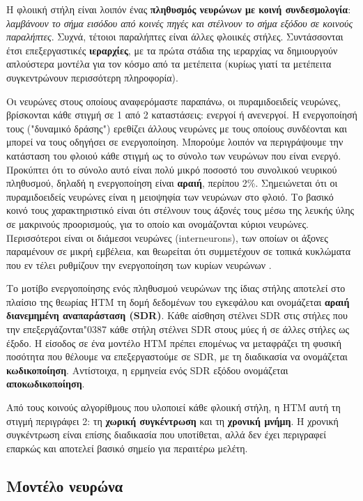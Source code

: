 	Η φλοιική στήλη είναι λοιπόν ένας \textbf{πληθυσμός νευρώνων με κοινή συνδεσμολογία}: \textit{λαμβάνουν το σήμα εισόδου από κοινές πηγές και στέλνουν το σήμα εξόδου σε κοινούς παραλήπτες}.
	Συχνά, τέτοιοι παραλήπτες είναι άλλες φλοιικές στήλες.
	Συντάσσονται έτσι επεξεργαστικές \textbf{ιεραρχίες}, με τα πρώτα στάδια της ιεραρχίας να δημιουργούν απλούστερα μοντέλα για τον κόσμο από τα μετέπειτα
	(κυρίως γιατί τα μετέπειτα συγκεντρώνουν περισσότερη πληροφορία).

	Οι νευρώνες στους οποίους αναφερόμαστε παραπάνω, οι πυραμιδοειδείς νευρώνες, βρίσκονται κάθε στιγμή σε 1 από 2 καταστάσεις: ενεργοί ή ανενεργοί.
	Η ενεργοποίησή τους ("δυναμικό δράσης") ερεθίζει άλλους νευρώνες με τους οποίους συνδέονται και μπορεί να τους οδηγήσει σε ενεργοποίηση.
	Μπορούμε λοιπόν να περιγράψουμε την κατάσταση του φλοιού κάθε στιγμή ως το σύνολο των νευρώνων που είναι ενεργό.
	Προκύπτει ότι το σύνολο αυτό είναι πολύ μικρό ποσοστό του συνολικού νευρικού πληθυσμού, δηλαδή η ενεργοποίηση είναι \textbf{αραιή}, περίπου 2\%.
	Σημειώνεται ότι οι πυραμιδοειδείς νευρώνες είναι η μειοψηφία των νευρώνων στο φλοιό.
	Το βασικό κοινό τους χαρακτηριστικό είναι ότι στέλνουν τους άξονές τους μέσω της λευκής ύλης σε μακρινούς προορισμούς, για το οποίο και ονομάζονται κύριοι νευρώνες.
	Περισσότεροι είναι οι διάμεσοι νευρώνες (interneurons), των οποίων οι άξονες παραμένουν σε μικρή εμβέλεια, και θεωρείται ότι συμμετέχουν σε τοπικά κυκλώματα
	που εν τέλει ρυθμίζουν την ενεργοποίηση των κυρίων νευρώνων \parencite{freundInterneurons2008}.

	Το μοτίβο ενεργοποίησης ενός πληθυσμού νευρώνων της ίδιας στήλης αποτελεί στο πλαίσιο της θεωρίας HTM τη δομή δεδομένων του εγκεφάλου
	και ονομάζεται \textbf{αραιή διανεμημένη αναπαράσταση (SDR)}.
	Κάθε αίσθηση στέλνει SDR στις στήλες που την επεξεργάζονται\char"0387  κάθε στήλη στέλνει SDR στους μύες ή σε άλλες στήλες ως έξοδο.
	Η είσοδος σε ένα μοντέλο HTM πρέπει επομένως να μεταφράζει τη φυσική ποσότητα που θέλουμε να επεξεργαστούμε σε SDR, με τη διαδικασία να ονομάζεται \textbf{κωδικοποίηση}.
	Αντίστοιχα, η ερμηνεία ενός SDR εξόδου ονομάζεται \textbf{αποκωδικοποίηση}.

	Από τους κοινούς αλγορίθμους που υλοποιεί κάθε φλοιική στήλη, η HTM αυτή τη στιγμή περιγράφει 2: τη \textbf{χωρική συγκέντρωση} και τη \textbf{χρονική μνήμη}.
	Η χρονική συγκέντρωση είναι επίσης διαδικασία που υποτίθεται, αλλά δεν έχει περιγραφεί επαρκώς και αποτελεί βασικό σημείο για περαιτέρω μελέτη.

\subsection{Μοντέλο νευρώνα} \label{htm:model_neuron}

